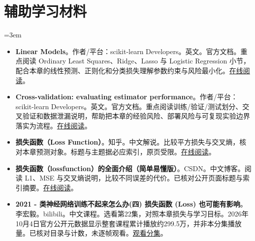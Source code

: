 \section*{辅助学习材料}
\begingroup
\emergencystretch=3em
\begin{itemize}
\item \textbf{Linear Models}。作者/平台：scikit-learn Developers。英文。官方文档。重点阅读 Ordinary Least Squares、Ridge、Lasso 与 Logistic Regression 小节，配合本章的线性预测、正则化和分类损失理解参数约束与风险最小化。\href{https://scikit-learn.org/stable/modules/linear\_model.html}{在线阅读}。
\item \textbf{Cross-validation: evaluating estimator performance}。作者/平台：scikit-learn Developers。英文。官方文档。重点阅读训练/验证/测试划分、交叉验证和数据泄漏说明，帮助把本章的经验风险、部署风险与可复现实验边界落实为流程。\href{https://scikit-learn.org/stable/modules/cross\_validation.html}{在线阅读}。
\item \textbf{损失函数（Loss Function）}。知乎。中文解说。比较平方损失与交叉熵，核对本章预测对象。标题与主题据必应索引，原页受限。\href{https://zhuanlan.zhihu.com/p/261059231}{在线阅读}。
\item \textbf{损失函数（lossfunction）的全面介绍（简单易懂版）}。CSDN。中文博客。阅读 L1、MSE 与交叉熵说明，比较不同误差的代价。已核对公开页面标题与索引摘要。\href{https://blog.csdn.net/weixin\_57643648/article/details/122704657}{在线阅读}。
\item \textbf{2021 - 类神经网络训练不起来怎么办(四) 损失函数 (Loss) 也可能有影响}。李宏毅。bilibili。中文课程。选看第22集，对照本章损失与学习目标。2026年10月4日官方公开元数据显示整套课程累计播放约299.5万，并非本分集播放量。已核对目录与计数，未逐帧观看。\href{https://www.bilibili.com/video/BV1Wv411h7kN/?p=22}{观看分集}。
\end{itemize}
\endgroup


